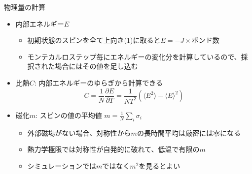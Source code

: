 \begin{frame}[t,fragile]{物理量の計算}
  \begin{itemize}
  \item 内部エネルギー$E$
    \begin{itemize}
    \item 初期状態のスピンを全て上向き(1)に取ると$E=-J \times \text{ボンド数}$
    \item モンテカルロステップ毎にエネルギーの変化分を計算しているので、採択された場合にはその値を足し込む
    \end{itemize}
  \item 比熱$C$: 内部エネルギーのゆらぎから計算できる
    \[
    C = \frac{1}{N} \frac{\partial E}{\partial T} = \frac{1}{NT^2} (\langle E^2 \rangle - \langle E \rangle^2)
    \]
  \item 磁化$m$: スピンの値の平均値 $m = \frac{1}{N} \sum_i \sigma_i$
    \begin{itemize}
    \item 外部磁場がない場合、対称性から$m$の長時間平均は厳密には零になる
    \item 熱力学極限では対称性が自発的に破れて、低温で有限の$m$
    \item シミュレーションでは$m$ではなく$m^2$を見るとよい
    \end{itemize}
  \end{itemize}
\end{frame}

